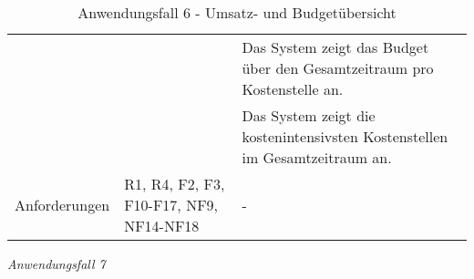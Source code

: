 \begin{table}[h]
\begin{adjustbox}{max width=\textwidth}
\begin{tabular}{lp{7.0cm}p{7.0cm}}
                                         & &Das System zeigt das Budget über den Gesamtzeitraum pro Kostenstelle an.\\
                                         & &Das System zeigt die kostenintensivsten Kostenstellen im Gesamtzeitraum an.\\

        Anforderungen                   &R1, R4, F2, F3, F10-F17, NF9, NF14-NF18& -\\
        \bottomrule
    \end{tabular}
    \end{adjustbox}
    \caption{%
    Anwendungsfall 6 - Umsatz- und Budgetübersicht   }
    \label{tab:AF_BudgetUmsatz}
    \end{table}
\endgroup



\clearpage
\noindent
\textit{Anwendungsfall 7}


